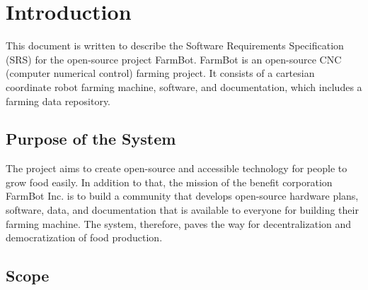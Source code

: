 
\chapter{Introduction} \label{introduction}

\quad This document is written to describe the Software Requirements Specification (SRS) \cite{8559686} for the open-source project FarmBot. FarmBot is an open-source CNC (computer numerical control) farming project. It consists of a cartesian coordinate robot farming machine, software, and documentation, which includes a farming data repository.

\section{Purpose of the System }
The project aims to create open-source and accessible technology for people to grow food easily. In addition to that, the mission of the benefit corporation FarmBot Inc. is to build a community that develops open-source hardware plans, software, data, and documentation that is available to everyone for building their farming machine. The system, therefore, paves the way for decentralization and democratization of food production.

\section{Scope}

